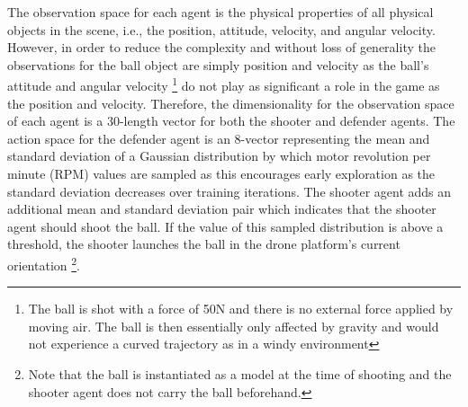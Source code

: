\documentclass{article}
\begin{document}
\noindent
The observation space for each agent is the physical properties of all physical objects in the scene, i.e., the position, attitude, velocity, and angular velocity. 
However, in order to reduce the complexity and without loss of generality the observations for the ball object are simply position and velocity as the ball's attitude and angular velocity \footnote{The ball is shot with a force of 50N and there is no external force applied by moving air. The ball is then essentially only affected by gravity and would not experience a curved trajectory as in a windy environment} do not play as significant a role in the game as the position and velocity. 
Therefore, the dimensionality for the observation space of each agent is a 30-length vector for both the shooter and defender agents. 
The action space for the defender agent is an 8-vector representing the mean and standard deviation of a Gaussian distribution by which motor revolution per minute (RPM) values are sampled as this encourages early exploration as the standard deviation decreases over training iterations. 
The shooter agent adds an additional mean and standard deviation pair which indicates that the shooter agent should shoot the ball. 
If the value of this sampled distribution is above a threshold, the shooter launches the ball in the drone platform's current orientation \footnote{Note that the ball is instantiated as a model at the time of shooting and the shooter agent does not carry the ball beforehand.}. 
\end{document}
